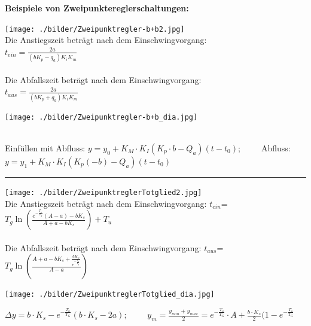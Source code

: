 		\textbf{Beispiele von Zweipunktereglerschaltungen:}\\
		\begin{minipage}{9cm}
			\vspace{.5cm}        
	 		\texttt{[image: ./bilder/Zweipunktregler-b+b2.jpg]}\\
			Die Anstiegszeit beträgt nach dem Einschwingvorgang:\\
			$t_{ein}=\frac{2a}{(b K_p - q_a)K_i K_m}$ \\ \\
			Die Abfallszeit beträgt nach dem Einschwingvorgang:\\
			$t_{aus}=\frac{2a}{(b K_p + q_a)K_i K_m}$\\
    \end{minipage}
		\begin{minipage}{9cm}
			\vspace{.5cm}        
			\texttt{[image: ./bilder/Zweipunktregler-b+b\_dia.jpg]}
        \end{minipage}\\
		Einfüllen mit Abfluss: $y = y_0 + K_M \cdot K_I(K_p \cdot b - Q_a)(t-t_0); \qquad$ 
		Abfluss: $y=y_1 + K_M \cdot K_I(K_p(-b) - Q_a)(t-t_0)$
	\vspace{.5cm}
	\hrule
	\vspace{.5cm}
		\begin{minipage}{9cm}
 		\texttt{[image: ./bilder/ZweipunktreglerTotglied2.jpg]}\\
			Die Anstiegszeit beträgt nach dem Einschwingvorgang:
			$t_{ein}$=$T_g\ln(\frac{e^{-\frac{T_u}{T_g}}(A-a)-b K_s}{A+a-b K_s})+T_u$\\ \\
			Die Abfallszeit beträgt nach dem Einschwingvorgang:
			$t_{aus}$=$T_g\ln(\frac{A+a-b
			K_s+\frac{b K_s}{e^{-\frac{T_u}{T_g}}}}{A-a})$\\
        \end{minipage}
		\begin{minipage}{9cm}
		\texttt{[image: ./bilder/ZweipunktreglerTotglied\_dia.jpg]}			
        \end{minipage}
	
	$\Delta y = b\cdot K_s - e^{-\frac{T_u}{T_G}}(b\cdot K_s - 2a); \qquad$
	$y_m = \frac{y_{min}+y_{max}}{2}=e^{-\frac{T_u}{T_G}}\cdot A + \frac{b\cdot K_s}{2}(1-e^{-\frac{T_u}{T_G}}$

